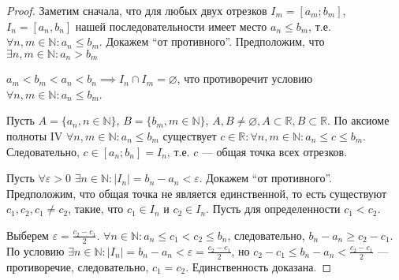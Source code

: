 \documentclass[a4paper,12pt]{article} %
\theoremstyle{remark}
\theoremstyle{definition}
\begin{document}
\begin{proof}
	Заметим сначала, что для любых двух отрезков $I_m = [a_m; b_m]$,  $I_n = [a_n, b_n]$ нашей последовательности имеет место $a_n \le b_m$, т.е. $\forall n, m \in  \mathbb{N} : a_n \le b_m$. Докажем ``от противного''. Предположим, что $\exists n, m \in  \mathbb{N} : a_n > b_m$	
\begin{center}
\end{center}
$a_m < b_m < a_n < b_n \implies I_n \cap I_m = \varnothing$, что противоречит условию $\forall n, m \in  \mathbb{N} : a_n \le b_m$.

Пусть $A = \{a_n, n \in  \mathbb{N}\}$, $B = \{b_m, m \in \mathbb{N}\}$, $A, B \neq \varnothing, A \subset \mathbb{R}, B \subset \mathbb{R}$. По аксиоме полноты IV $\forall n, m \in \mathbb{N} : a_n \le b_m$ существует $c\in \mathbb{R} : \forall n, m \in  \mathbb{N} : a_n \le  c \le  b_m$. Следовательно, $c\in [a_n; b_n] = I_n$, т.е. $c$ --- общая точка всех отрезков.

Пусть $\forall \varepsilon > 0$ $\exists n \in  \mathbb{N} : |I_n| = b_n-a_n < \varepsilon$. Докажем ``от противного''. Предположим, что общая точка не является единственной, то есть существуют $c_1, c_2, c_1\neq c_2$, такие, что $c_1 \in  I_n$ и $c_2 \in  I_n$. Пусть для определенности $c_1<c_2$.

\begin{center}
\end{center}

Выберем $\displaystyle \varepsilon = \frac{c_2-c_1}{2}$. $\forall n\in \mathbb{N} : a_n \le  c_1 < c_2 \le b_n$,
следовательно, $b_n - a_n \ge c_2-c_1$. По условию $\displaystyle \exists n \in  \mathbb{N} : |I_n| = b_n - a_n < \varepsilon 
= \frac{c_2-c_1}{2}$, но $\displaystyle c_2-c_1 \le b_n  - a_n < \frac{c_2-c_1}{2}$ --- противоречие, следовательно,
$c_1=c_2$. Единственность доказана.
\end{proof}
\end{document}
